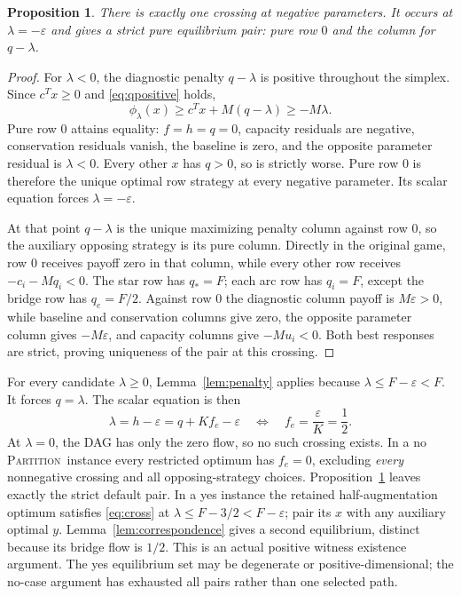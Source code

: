 \documentclass[11pt]{article}
\newtheorem{proposition}[theorem]{Proposition}
\theoremstyle{remark}\newtheorem{remark}[theorem]{Remark}
\newcommand{\PART}{\textsc{Partition}}
\newcommand{\eps}{\varepsilon}
\begin{document}
\begin{proposition}\label{prop:default}
There is exactly one crossing at negative parameters. It occurs at $\lambda=-\eps$ and gives a strict pure equilibrium pair: pure row $0$ and the column for $q-\lambda$.
\end{proposition}
\begin{proof}
For $\lambda<0$, the diagnostic penalty $q-\lambda$ is positive throughout the simplex. Since $c^Tx\ge0$ and \eqref{eq:qpositive} holds,
\[
 \phi_\lambda(x)\ge c^Tx+M(q-\lambda)\ge-M\lambda.
\]
Pure row $0$ attains equality: $f=h=q=0$, capacity residuals are negative, conservation residuals vanish, the baseline is zero, and the opposite parameter residual is $\lambda<0$. Every other $x$ has $q>0$, so is strictly worse. Pure row $0$ is therefore the unique optimal row strategy at every negative parameter. Its scalar equation forces $\lambda=-\eps$.

At that point $q-\lambda$ is the unique maximizing penalty column against row $0$, so the auxiliary opposing strategy is its pure column. Directly in the original game, row $0$ receives payoff zero in that column, while every other row receives $-c_i-Mq_i<0$. The star row has $q_*=F$; each arc row has $q_i=F$, except the bridge row has $q_e=F/2$. Against row $0$ the diagnostic column payoff is $M\eps>0$, while baseline and conservation columns give zero, the opposite parameter column gives $-M\eps$, and capacity columns give $-Mu_i<0$. Both best responses are strict, proving uniqueness of the pair at this crossing.
\end{proof}

For every candidate $\lambda\ge0$, Lemma~\ref{lem:penalty} applies because $\lambda\le F-\eps<F$. It forces $q=\lambda$. The scalar equation is then
\begin{equation}\label{eq:cross}
 \lambda=h-\eps=q+Kf_e-\eps
 \quad\Longleftrightarrow\quad f_e=\frac\eps K=\frac12.
\end{equation}
At $\lambda=0$, the DAG has only the zero flow, so no such crossing exists. In a no \PART\ instance every restricted optimum has $f_e=0$, excluding \emph{every} nonnegative crossing and all opposing-strategy choices. Proposition~\ref{prop:default} leaves exactly the strict default pair. In a yes instance the retained half-augmentation optimum satisfies \eqref{eq:cross} at $\lambda\le F-3/2<F-\eps$; pair its $x$ with any auxiliary optimal $y$. Lemma~\ref{lem:correspondence} gives a second equilibrium, distinct because its bridge flow is $1/2$. This is an actual positive witness existence argument. The yes equilibrium set may be degenerate or positive-dimensional; the no-case argument has exhausted all pairs rather than one selected path.
\end{document}
